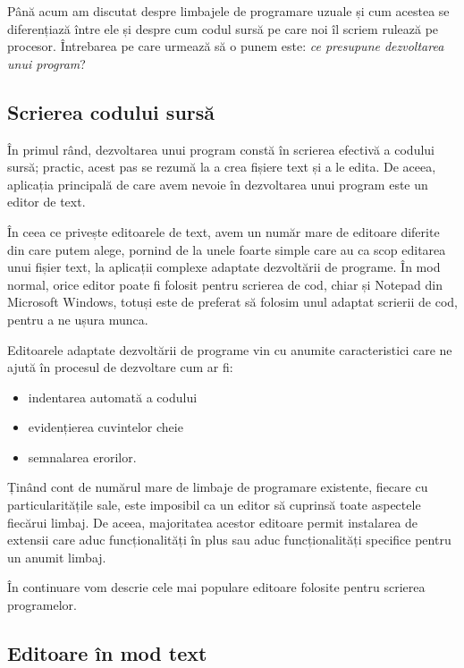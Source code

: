 Până acum am discutat despre limbajele de programare uzuale și cum acestea se
diferențiază între ele și despre cum codul sursă pe care noi îl scriem rulează
pe procesor. Întrebarea pe care urmează să o punem este: \textit{ce presupune
dezvoltarea unui program}?

\subsection{Scrierea codului sursă}
\label{sec:appdev-writing}

În primul rând, dezvoltarea unui program constă în scrierea efectivă a codului
sursă; practic, acest pas se rezumă la a crea fișiere text și a le edita. De
aceea, aplicația principală de care avem nevoie în dezvoltarea unui program este
un editor de text.

În ceea ce privește editoarele de text, avem un număr mare de editoare diferite
din care putem alege, pornind de la unele foarte simple care au ca scop editarea
unui fișier text, la aplicații complexe adaptate dezvoltării de programe. În mod
normal, orice editor poate fi folosit pentru scrierea de cod, chiar și Notepad
din Microsoft Windows, totuși este de preferat să folosim unul adaptat scrierii
de cod, pentru a ne ușura munca.

Editoarele adaptate dezvoltării de programe vin cu anumite caracteristici care
ne ajută în procesul de dezvoltare cum ar fi:

\begin{itemize}
	\item indentarea automată a codului
	\item evidențierea cuvintelor cheie
	\item semnalarea erorilor.
\end{itemize}

Ținând cont de numărul mare de limbaje de programare existente, fiecare cu
particularitățile sale, este imposibil ca un editor să cuprinsă toate aspectele
fiecărui limbaj. De aceea, majoritatea acestor editoare permit instalarea de
extensii care aduc funcționalități în plus sau aduc funcționalități specifice
pentru un anumit limbaj.

În continuare vom descrie cele mai populare editoare folosite pentru scrierea
programelor.

\subsection{Editoare în mod text}
\label{sec:appdev-textedit}

